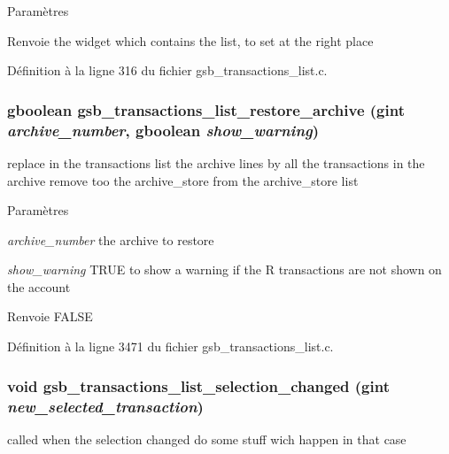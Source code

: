 \begin{DoxyParams}{Paramètres}
\item[{\em }]\end{DoxyParams}
\begin{DoxyReturn}{Renvoie}
the widget which contains the list, to set at the right place 
\end{DoxyReturn}


Définition à la ligne 316 du fichier gsb\_\-transactions\_\-list.c.

\subsubsection[{gsb\_\-transactions\_\-list\_\-restore\_\-archive}]{\setlength{\rightskip}{0pt plus 5cm}gboolean gsb\_\-transactions\_\-list\_\-restore\_\-archive (gint {\em archive\_\-number}, \/  gboolean {\em show\_\-warning})}\label{gsb__transactions__list_8c_afb50643bfc50dcd627a5f720c30c8765}
replace in the transactions list the archive lines by all the transactions in the archive remove too the archive\_\-store from the archive\_\-store list


\begin{DoxyParams}{Paramètres}
\item[{\em archive\_\-number}]the archive to restore \item[{\em show\_\-warning}]TRUE to show a warning if the R transactions are not shown on the account\end{DoxyParams}
\begin{DoxyReturn}{Renvoie}
FALSE 
\end{DoxyReturn}


Définition à la ligne 3471 du fichier gsb\_\-transactions\_\-list.c.

\subsubsection[{gsb\_\-transactions\_\-list\_\-selection\_\-changed}]{\setlength{\rightskip}{0pt plus 5cm}void gsb\_\-transactions\_\-list\_\-selection\_\-changed (gint {\em new\_\-selected\_\-transaction})}\label{gsb__transactions__list_8c_a2528e018beffeb0d2ce2f2386e690360}
called when the selection changed do some stuff wich happen in that case


